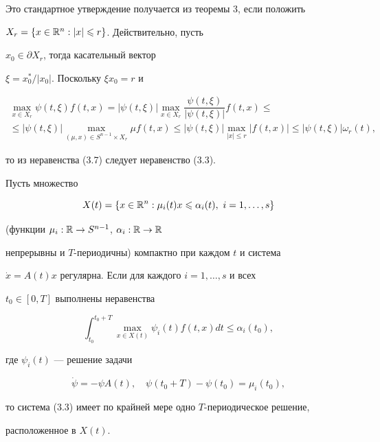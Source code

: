 Это стандартное утверждение получается из теоремы 3, если положить


$X_r = \{x\in \Bbb R^{n} : |x|\le r\}$. Действительно, пусть


$x_0\in \partial X_r$, тогда касательный вектор


$\xi=x_0^{*}/|x_0|$. Поскольку $\xi x_0 =r$ и


%


\begin{multline*}


\max_{x\in X_r}\psi(t,\xi)f(t,x)=|\psi(t,\xi)|\max_{x\in X_r}


\dfrac {\psi(t,\xi)}{|\psi(t,\xi)|}f(t,x)\le \\


%


\le |\psi(t,\xi)|\max_{(\mu,x)\in S^{n-1}\times X_{r}}\mu f(t,x)\le


|\psi(t,\xi)|\max_{|x|\le r}|f(t,x)|\le


|\psi(t,\xi)|\omega_r(t),


\end{multline*}


%


то из неравенства (3.7) следует неравенство (3.3).





\begin{cor} Пусть множество


$$


X(t)=\{x\in \Bbb R^{n} : \mu_i(t)x \le \alpha_i(t), \ i=1, \dotsc, s\}


$$


(функции $\mu_i : \Bbb R \to S^{n-1}$, $\alpha_i : \Bbb R \to \Bbb R$


непрерывны и $T$-периодичны) компактно при каждом $t$ и система


$\Dot x=A(t)x$ регулярна. Если для каждого $i=1,\dotsc,s$ и всех


$t_0\in [0,T]$ выполнены неравенства


$$


\int_{t_0}^{t_0+T}\max_{x\in X(t)}\psi_i(t)f(t,x)dt\le\alpha_i(t_0),


$$


где $\psi_i(t)$ --- решение задачи


$$


\Dot \psi = -\psi A(t),\quad \psi (t_0 + T) - \psi (t_0) = \mu_i(t_0),


$$


то система (3.3) имеет по крайней мере одно $T$-периодическое решение,


расположенное в $X(t)$.


\end{cor}





